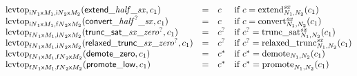 $$
\begin{array}[t]{@{}lcl@{}l@{}}
{{\mathrm{lcvtop}}}_{{{{\mathsf{i}}{N}}_1}{\mathsf{x}}{M_1}, {{{\mathsf{i}}{N}}_2}{\mathsf{x}}{M_2}}({\mathsf{extend}}{\mathsf{\_}}{{\mathit{half}}}{\mathsf{\_}}{{\mathit{sx}}}, c_1) & = & c & \quad \mbox{if}~ c = {{{{\mathrm{extend}}}_{N_1, N_2}^{{\mathit{sx}}}}}{(c_1)} \\
{{\mathrm{lcvtop}}}_{{{{\mathsf{i}}{N}}_1}{\mathsf{x}}{M_1}, {{{\mathsf{f}}{N}}_2}{\mathsf{x}}{M_2}}({\mathsf{convert}}{\mathsf{\_}}{{{\mathit{half}}^?}}{\mathsf{\_}}{{\mathit{sx}}}, c_1) & = & c & \quad \mbox{if}~ c = {{{{\mathrm{convert}}}_{N_1, N_2}^{{\mathit{sx}}}}}{(c_1)} \\
{{\mathrm{lcvtop}}}_{{{{\mathsf{f}}{N}}_1}{\mathsf{x}}{M_1}, {{{\mathsf{i}}{N}}_2}{\mathsf{x}}{M_2}}({\mathsf{trunc\_sat}}{\mathsf{\_}}{{\mathit{sx}}}{\mathsf{\_}}{{{\mathit{zero}}^?}}, c_1) & = & {c^?} & \quad \mbox{if}~ {c^?} = {{{{\mathrm{trunc\_sat}}}_{N_1, N_2}^{{\mathit{sx}}}}}{(c_1)} \\
{{\mathrm{lcvtop}}}_{{{{\mathsf{f}}{N}}_1}{\mathsf{x}}{M_1}, {{{\mathsf{i}}{N}}_2}{\mathsf{x}}{M_2}}({\mathsf{relaxed\_trunc}}{\mathsf{\_}}{{\mathit{sx}}}{\mathsf{\_}}{{{\mathit{zero}}^?}}, c_1) & = & {c^?} & \quad \mbox{if}~ {c^?} = {{{{\mathrm{relaxed\_trunc}}}_{N_1, N_2}^{{\mathit{sx}}}}}{(c_1)} \\
{{\mathrm{lcvtop}}}_{{{{\mathsf{f}}{N}}_1}{\mathsf{x}}{M_1}, {{{\mathsf{f}}{N}}_2}{\mathsf{x}}{M_2}}({\mathsf{demote}}{\mathsf{\_}}{\mathsf{zero}}, c_1) & = & {c^\ast} & \quad \mbox{if}~ {c^\ast} = {{\mathrm{demote}}}_{N_1, N_2}(c_1) \\
{{\mathrm{lcvtop}}}_{{{{\mathsf{f}}{N}}_1}{\mathsf{x}}{M_1}, {{{\mathsf{f}}{N}}_2}{\mathsf{x}}{M_2}}({\mathsf{promote}}{\mathsf{\_}}{\mathsf{low}}, c_1) & = & {c^\ast} & \quad \mbox{if}~ {c^\ast} = {{\mathrm{promote}}}_{N_1, N_2}(c_1) \\
\end{array}
$$

